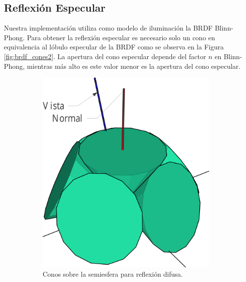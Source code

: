\subsection{Reflexión Especular}
Nuestra implementación utiliza como modelo de iluminación la \ac{BRDF} Blinn-Phong. Para obtener la reflexión especular es necesario solo un cono en equivalencia al lóbulo especular de la \ac{BRDF} como se observa en la Figura \ref{fig:brdf_cones2}. La apertura del cono especular depende del factor $n$ en Blinn-Phong, mientras más alto es este valor menor es la apertura del cono especular.
\begin{figure}[H]
	\centering
	\begin{subfigure}[t]{.32\linewidth}
		\centering
		\captionsetup{justification=centering}
		\includegraphics[width=\linewidth]{media/diffuse_cones_cropped.pdf}
		\caption*{Conos sobre la semiesfera para reflexión difusa.}
	\end{subfigure}%
	\hspace{0.01\textwidth}
	\begin{subfigure}[t]{.32\linewidth}
		\centering
		\captionsetup{justification=centering}

\end{subfigure}
\end{figure}
